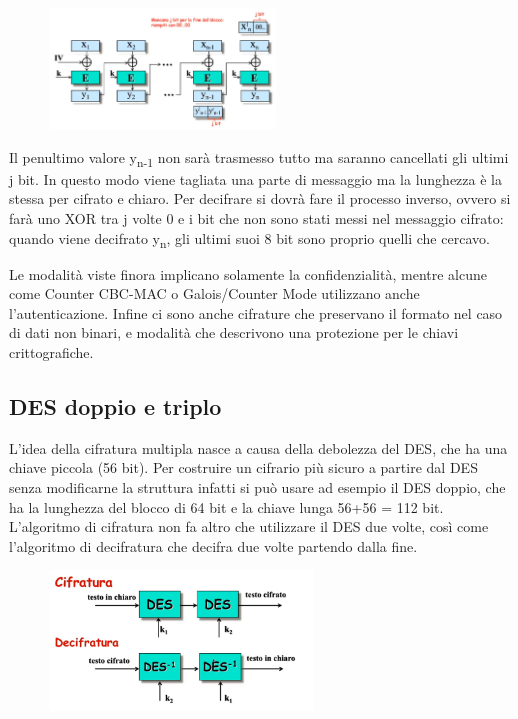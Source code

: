 \begin{figure}[htb!]
    \centering
    \includegraphics[width=6cm]{./Images/cap1/1.10.png}
\end{figure} 

Il penultimo valore y\textsubscript{n-1} non sarà trasmesso tutto ma saranno cancellati gli ultimi j bit. In questo modo viene tagliata una parte di messaggio ma la lunghezza è la stessa per cifrato e chiaro. Per decifrare si dovrà fare il processo inverso, ovvero si farà uno XOR tra j volte 0 e i bit che non sono stati messi nel messaggio cifrato: quando viene decifrato y\textsubscript{n}, gli ultimi suoi 8 bit sono proprio quelli che cercavo.

Le modalità viste finora implicano solamente la confidenzialità, mentre alcune come Counter CBC-MAC o Galois/Counter Mode utilizzano anche l'autenticazione. Infine ci sono anche cifrature che preservano il formato nel caso di dati non binari, e modalità che descrivono una protezione per le chiavi crittografiche.

\subsection{DES doppio e triplo}
L'idea della cifratura multipla nasce a causa della debolezza del DES, che ha una chiave piccola (56 bit). Per costruire un cifrario più sicuro a partire dal DES senza modificarne la struttura infatti si può usare ad esempio il DES doppio, che ha la lunghezza del blocco di 64 bit e la chiave lunga 56+56 = 112 bit. L'algoritmo di cifratura non fa altro che utilizzare il DES due volte, così come l'algoritmo di decifratura che decifra due volte partendo dalla fine.

\begin{figure}[htb!]
    \centering
    \includegraphics[width=7cm]{./Images/cap1/1.11.png}
\end{figure} 

